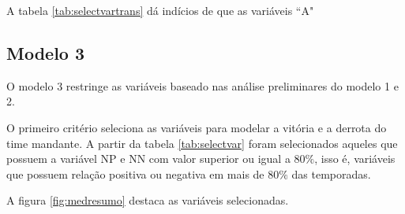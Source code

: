 \documentclass[doc,apacite,oneside,a4paper,12pt]{apa6}
\begin{document}
\begin{table}[ht]
    \label{tab:selectvartrans}
\end{table}

A tabela \ref{tab:selectvartrans} dá indícios de que as variáveis ``A"


\newpage
\subsection{Modelo 3}
\label{sec:mod3}

O modelo 3 restringe as variáveis baseado nas análise preliminares do modelo 1 e 2.

O primeiro critério seleciona as variáveis para modelar a vitória e a derrota do time mandante. A partir da tabela \ref{tab:selectvar} foram selecionados aqueles que possuem a variável NP e NN com valor superior ou igual a $80\%$, isso é, variáveis que possuem relação positiva ou negativa em mais de $80\%$ das temporadas.

A figura \ref{fig:medresumo} destaca as variáveis selecionadas.
\end{document}
